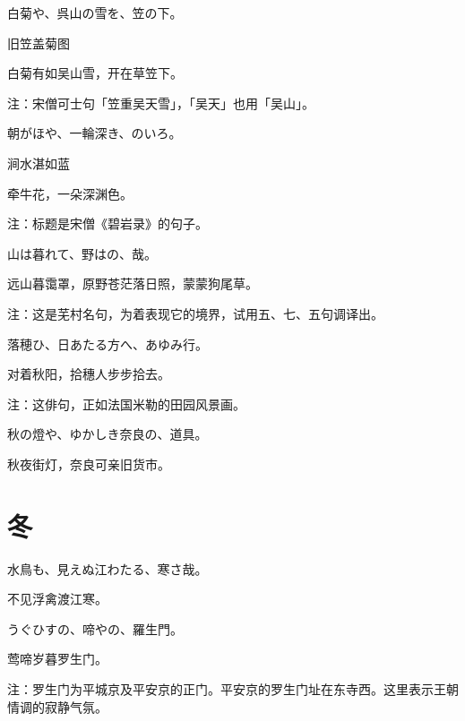 \begin{haiku}
    {\FH 白菊や、呉山の雪を、笠の下。}

    {\FK 旧笠盖菊图}

    {\FK 白菊有如吴山雪，开在草笠下。}

    {\FT 注：宋僧可士句「笠重吴天雪」，「吴天」也用「吴山」。}
\end{haiku}

\begin{haiku}
    {\FH 朝がほや、一輪深き、のいろ。}

    {\FK 涧水湛如蓝}

    {\FK 牵牛花，一朵深渊色。}

    {\FT 注：标题是宋僧《碧岩录》的句子。}
\end{haiku}

\begin{haiku}
    {\FH 山は暮れて、野はの、哉。}

    {\FK 远山暮霭罩，原野苍茫落日照，蒙蒙狗尾草。}

    {\FT 注：这是芜村名句，为着表现它的境界，试用五、七、五句调译出。}
\end{haiku}

\begin{haiku}
    {\FH 落穂ひ、日あたる方へ、あゆみ行。}

    {\FK 对着秋阳，拾穗人步步拾去。}

    {\FT 注：这俳句，正如法国米勒的田园风景画。}
\end{haiku}

\begin{haiku}
    {\FH 秋の燈や、ゆかしき奈良の、道具。}

    {\FK 秋夜街灯，奈良可亲旧货市。}
\end{haiku}

\section{\FK 冬}

\setcounter{haikucounter}{0}

\begin{haiku}
    {\FH 水鳥も、見えぬ江わたる、寒さ哉。}

    {\FK 不见浮禽渡江寒。}
\end{haiku}

\begin{haiku}
    {\FH うぐひすの、啼やの、羅生門。}

    {\FK 莺啼岁暮罗生门。}

    {\FT 注：罗生门为平城京及平安京的正门。平安京的罗生门址在东寺西。这里表示王朝情调的寂静气氛。}
\end{haiku}

